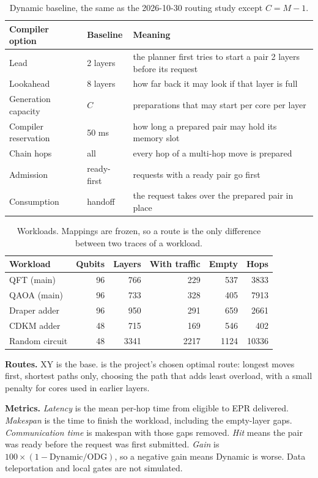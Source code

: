 \documentclass[10.5pt,a4paper]{article}
\newcommand{\code}[1]{\texttt{\detokenize{#1}}}
\begin{document}
\begin{table}[H]\centering\small
\begin{tabular}{@{}llp{9.4cm}@{}}\toprule
Compiler option & Baseline & Meaning \\\midrule
Lead & 2 layers & the planner first tries to start a pair 2 layers before its request \\
Lookahead & 8 layers & how far back it may look if that layer is full \\
Generation capacity & $C$ & preparations that may start per core per layer \\
Compiler reservation & 50 ms & how long a prepared pair may hold its memory slot \\
Chain hops & all & every hop of a multi-hop move is prepared \\
Admission & ready-first & requests with a ready pair go first \\
Consumption & handoff & the request takes over the prepared pair in place \\\bottomrule
\end{tabular}\caption{Dynamic baseline, the same as the 2026-10-30 routing study except $C=M-1$.}\end{table}

\begin{table}[H]\centering\small
\begin{tabular}{@{}lrrrrr@{}}\toprule
Workload & Qubits & Layers & With traffic & Empty & Hops \\\midrule
QFT (main) & 96 & 766 & 229 & 537 & 3833 \\
QAOA (main) & 96 & 733 & 328 & 405 & 7913 \\
Draper adder & 96 & 950 & 291 & 659 & 2661 \\
CDKM adder & 48 & 715 & 169 & 546 & 402 \\
Random circuit & 48 & 3341 & 2217 & 1124 & 10336 \\\bottomrule
\end{tabular}\caption{Workloads. Mappings are frozen, so a route is the only difference between two traces of a workload.}\end{table}

\textbf{Routes.} XY is the base. \code{history} is the project's chosen optimal route: longest moves first, shortest paths only,
choosing the path that adds least overload, with a small penalty for cores used in earlier layers.

\textbf{Metrics.}
\emph{Latency} is the mean per-hop time from eligible to EPR delivered.
\emph{Makespan} is the time to finish the workload, including the empty-layer gaps.
\emph{Communication time} is makespan with those gaps removed.
\emph{Hit} means the pair was ready before the request was first submitted.
\emph{Gain} is $100\times(1-\text{Dynamic}/\text{ODG})$, so a negative gain means Dynamic is worse.
Data teleportation and local gates are not simulated.
\end{document}
